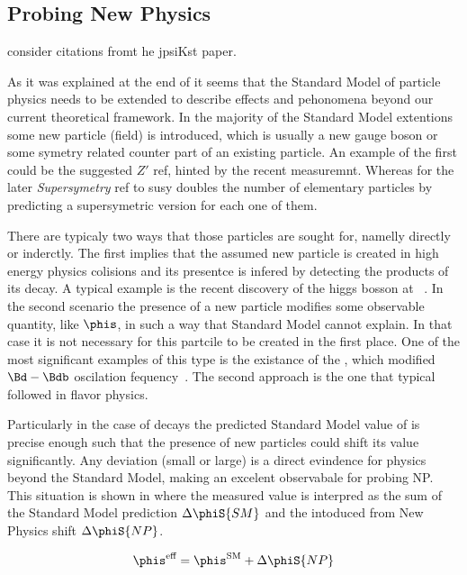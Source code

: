 \subsection{Probing New Physics}
\label{probe_new_phys}

{\color{red} consider citations fromt he jpsiKst paper.}

As it was explained at the end of  it seems that the Standard Model of particle physics needs to be extended
to describe effects and pehonomena beyond our current theoretical framework. In the majority of the Standard Model
extentions some new particle (field) is introduced, which is usually a new gauge boson or some symetry related
counter part of an existing particle. An example of the first could be the suggested $Z'$ {\color{red} ref}, hinted by
the recent \lhcb measuremnt. Whereas for the later {\it {Supersymetry}} {\color{red} ref to susy} doubles the
number of elementary particles by predicting a supersymetric version for each one of them.

There are typicaly two ways that those particles are sought for, namelly directly or inderctly. The first implies that the
assumed new particle is created in high energy physics colisions and its presentce is infered by detecting the products of
its decay. A typical example is the recent discovery of the higgs bosson at \lhc~\cite{higgs-cms,higgs-atlas}.
In the second scenario the presence of a new particle modifies some observable quantity, like $\phis$, in such a way that Standard Model
cannot explain. In that case it is not necessary for this partcile to be created in the first place.
One of the most significant examples of this type is the existance of the \tquark, which modified $\Bd-\Bdb$
oscilation fequency~\cite{argus-bbmix}. The second approach is the one that typical followed in flavor physics.

Particularly in the case of \BsJpsiPhi decays the predicted Standard Model value of  is precise enough
such that the presence of new particles could shift its value ~\cite{Buras:2009if,Chiang:2009ev,Datta:2009fk} significantly.
Any deviation (small or large) is a direct evindence for physics beyond the Standard Model, making \phis an excelent observabale for probing NP.
This situation is shown in  where the measured value  is interpred
as the sum of the Standard Model prediction $\Delta\phiS{SM}$ and the intoduced from New Physics shift $\Delta\phiS{NP}$.

\begin{equation}
 \phis^{\text {eff}} = \phis^{\tiny \text{SM}} + \Delta\phiS{NP}
 \label{phis_meas}
\end{equation}


